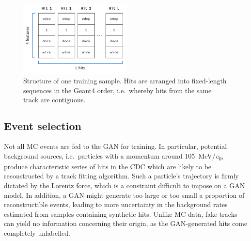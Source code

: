 \begin{figure}
    \centering
    \includegraphics[width=0.5\textwidth]{chapter4/hit_sequence.drawio.pdf}
    \caption{Structure of one training sample. Hits are arranged into fixed-length sequences in the {\sc Geant4} order, i.e.\ whereby hits from the same track are contiguous.}
    \label{fig:hit_data_structure}
\end{figure}



\subsection{Event selection}


Not all MC events are fed to the GAN for training. In particular, potential background sources, i.e.\ particles with a momentum around \SI{105}{MeV/\clight}, produce characteristic series of hits in the CDC which are likely to be reconstructed by a track fitting algorithm. Such a particle's trajectory is firmly dictated by the Lorentz force, which is a constraint difficult to impose on a GAN model. In addition, a GAN might generate too large or too small a proportion of reconstructible events, leading to more uncertainty in the background rates estimated from samples containing synthetic hits. Unlike MC data, fake tracks can yield no information concerning their origin, as the GAN-generated hits come completely unlabelled.

